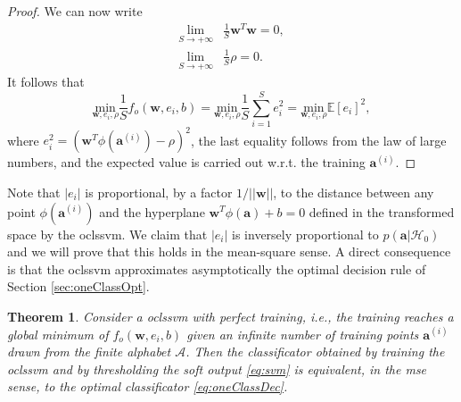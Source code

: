 \documentclass[draftcls,onecolumn,12pt]{IEEEtran}
\newcommand{\ie}{i.e., }
\newcommand{\wrt}{w.r.t. }
\newcommand{\Exp}[1]{\mathbb{E}\left[#1\right]}
\newtheorem{theorem}{Theorem}
\begin{document}
\begin{proof}
We can now write
\begin{equation}
\begin{aligned}
\lim_{S \to +\infty} &\frac{1}{S} \mathbf{w}^T\mathbf{w} =0, \\
\lim_{S \to +\infty} &\frac{1}{S}\rho =0.
\end{aligned}		
\end{equation}
It follows that
\begin{equation}
	\underset{\mathbf{w},e_i, \rho}{\text{min}} \frac{1}{S} f_o(\mathbf{w},e_i, b) = 
	\underset{\mathbf{w},e_i, \rho}{\text{min}} \frac{1}{S} \sum_{i=1}^S e_i^2 = 
	\underset{\mathbf{w},e_i, \rho}{\text{min}} \Exp{e_i}^2,	
\end{equation}
where $e_i^2 = (\mathbf{w}^T \phi (\mathbf{a}^{(i)}) -\rho)^2 $, the last equality follows from the law of large numbers, and the expected value is carried out \wrt the training $\mathbf{a}^{(i)}$.
\end{proof}

Note that $|e_i|$ is proportional, by a factor $1/||\mathbf{w}||$, to the distance between any point $\phi(\mathbf{a}^{(i)})$ and the hyperplane $\mathbf{w}^T \phi (\mathbf{a}) + b = 0$ defined in the transformed space by the \ac{oclssvm}. We claim that $|e_i|$ is inversely proportional to $p(\mathbf{a}|\mathcal{H}_0)$ and we will prove that this holds in the mean-square sense. A direct consequence is that the \ac{oclssvm} approximates asymptotically the optimal decision rule of Section \ref{sec:oneClassOpt}. 

\begin{theorem}
	\label{th:onelsnp}
	Consider a \ac{oclssvm} with perfect training, \ie the training reaches a global minimum of $f_o(\mathbf{w},e_i,b)$ given an infinite number of training points $\bm{a}^{(i)}$ drawn from the finite alphabet $\mathcal A$. Then the classificator obtained by training the \ac{oclssvm} and by thresholding the soft output \eqref{eq:svm} is equivalent, in the \ac{mse} sense, to the optimal classificator \eqref{eq:oneClassDec}.
\end{theorem}
\end{document}
